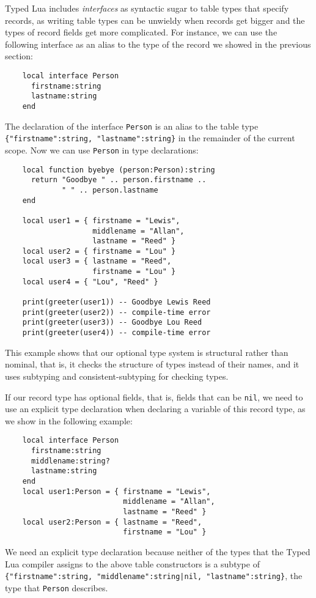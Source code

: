 Typed Lua includes \emph{interfaces} as syntactic sugar to table types
that specify records, as writing table types can be unwieldy when
records get bigger and the types of record fields get more complicated.
For instance, we can use the following interface as an alias to the
type of the record we showed in the previous section:
\begin{verbatim}
    local interface Person
      firstname:string
      lastname:string
    end
\end{verbatim}

The declaration of the interface \texttt{Person} is an alias to the
table type \texttt{\{"firstname":string, "lastname":string\}} in the
remainder of the current scope.
Now we can use \texttt{Person} in type declarations:
\begin{verbatim}
    local function byebye (person:Person):string
      return "Goodbye " .. person.firstname ..
             " " .. person.lastname
    end

    local user1 = { firstname = "Lewis",
                    middlename = "Allan",
                    lastname = "Reed" }
    local user2 = { firstname = "Lou" }
    local user3 = { lastname = "Reed",
                    firstname = "Lou" }
    local user4 = { "Lou", "Reed" }

    print(greeter(user1)) -- Goodbye Lewis Reed 
    print(greeter(user2)) -- compile-time error
    print(greeter(user3)) -- Goodbye Lou Reed
    print(greeter(user4)) -- compile-time error
\end{verbatim}

This example shows that our optional type system is structural rather
than nominal, that is, it checks the structure of types instead of
their names, and it uses subtyping and consistent-subtyping for
checking types.

If our record type has optional fields, that is, fields that can be \texttt{nil},
we need to use an explicit type declaration when declaring a
variable of this record type, as we show in the following example:
\begin{verbatim}
    local interface Person
      firstname:string
      middlename:string?
      lastname:string
    end
    local user1:Person = { firstname = "Lewis",
                           middlename = "Allan",
                           lastname = "Reed" }
    local user2:Person = { lastname = "Reed",
                           firstname = "Lou" }
\end{verbatim}

We need an explicit type declaration because neither of the types
that the Typed Lua compiler assigns to the above table constructors
is a subtype of
\texttt{\{"firstname":string, "middlename":string|nil, "lastname":string\}},
the type that \texttt{Person} describes.

